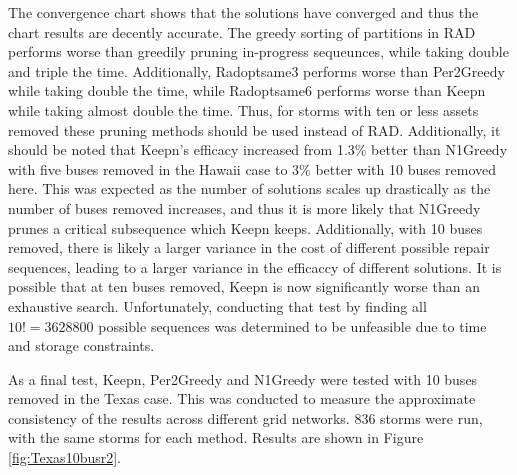 \documentclass[12pt]{article}
\begin{document}
The convergence chart shows that the solutions have converged and thus the chart results are decently accurate. The greedy sorting of partitions in RAD performs worse than greedily pruning in-progress sequeunces, while taking double and triple the time. Additionally, Radoptsame3 performs worse than Per2Greedy while taking double the time, while Radoptsame6 performs worse than Keepn while taking almost double the time. Thus, for storms with ten or less assets removed these pruning methods should be used instead of RAD. Additionally, it should be noted that Keepn's efficacy increased from 1.3\% better than N1Greedy with five buses removed in the Hawaii case to 3\% better with 10 buses removed here. This was expected as the number of solutions scales up drastically as the number of buses removed increases, and thus it is more likely that N1Greedy prunes a critical subsequence which Keepn keeps. Additionally, with 10 buses removed, there is likely a larger variance in the cost of different possible repair sequences, leading to a larger variance in the efficaccy of different solutions. It is possible that at ten buses removed, Keepn is now significantly worse than an exhaustive search. Unfortunately, conducting that test by finding all $10! = 3628800$ possible sequences was determined to be unfeasible due to time and storage constraints. \par

As a final test, Keepn, Per2Greedy and N1Greedy were tested with 10 buses removed in the Texas case. This was conducted to measure the approximate consistency of the results across different grid networks. 836 storms were run, with the same storms for each method. Results are shown in Figure \ref{fig:Texas10busr2}.
\end{document}
